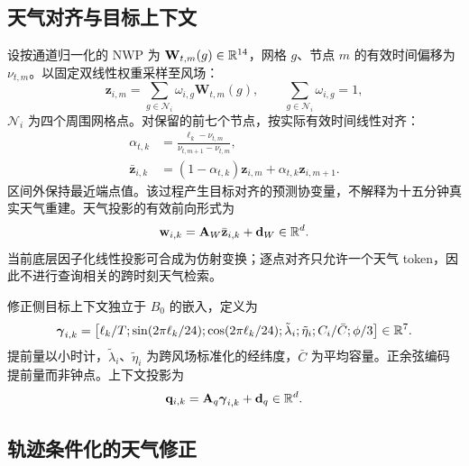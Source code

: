 \subsection{天气对齐与目标上下文}
\label{sec:weather}

设按通道归一化的 NWP 为 $\mathbf W_{t,m}(g)\in\mathbb{R}^{14}$，网格 $g$、节点 $m$ 的有效时间偏移为 $\nu_{t,m}$。以固定双线性权重采样至风场：
\begin{equation}
 \mathbf z_{i,m}=\sum_{g\in\mathcal N_i}\omega_{i,g}\mathbf W_{t,m}(g),
 \qquad \sum_{g\in\mathcal N_i}\omega_{i,g}=1,
\end{equation}
$\mathcal N_i$ 为四个周围网格点。对保留的前七个节点，按实际有效时间线性对齐：
\begin{align}
 \alpha_{t,k}&=\frac{\ell_k-\nu_{t,m}}{\nu_{t,m+1}-\nu_{t,m}},\\
 \bar{\mathbf z}_{i,k}&=(1-\alpha_{t,k})\mathbf z_{i,m}
                         +\alpha_{t,k}\mathbf z_{i,m+1}.\label{eq:interpolation}
\end{align}
区间外保持最近端点值。该过程产生目标对齐的预测协变量，不解释为十五分钟真实天气重建。天气投影的有效前向形式为
\begin{equation}
 \mathbf w_{i,k}=\mathbf A_W\bar{\mathbf z}_{i,k}+\mathbf d_W\in\mathbb{R}^d.
 \label{eq:weather-projection}
\end{equation}
当前底层因子化线性投影可合成为仿射变换；逐点对齐只允许一个天气 token，因此不进行查询相关的跨时刻天气检索。

修正侧目标上下文独立于 $B_0$ 的嵌入，定义为
\begin{equation}
 \boldsymbol\gamma_{i,k}=\left[
 \ell_k/T;\sin(2\pi\ell_k/24);\cos(2\pi\ell_k/24);
 \tilde\lambda_i;\tilde\eta_i;C_i/\bar C;\phi/3\right]\in\mathbb{R}^7.
\end{equation}
提前量以小时计，$\tilde\lambda_i$、$\tilde\eta_i$ 为跨风场标准化的经纬度，$\bar C$ 为平均容量。正余弦编码提前量而非钟点。上下文投影为
\begin{equation}
 \mathbf q_{i,k}=\mathbf A_q\boldsymbol\gamma_{i,k}+\mathbf d_q\in\mathbb{R}^d.
\end{equation}

\subsection{轨迹条件化的天气修正}
\label{sec:correction}

